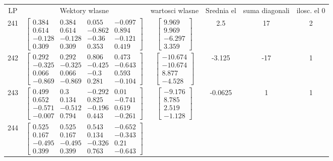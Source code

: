 \documentclass[a4paper,12pt]{article}
\begin{document}
\bgroup {} \vspace{0.2in} \begin{tabular}{c c c c c c}
LP &Wektory wlasne & wartosci wlasne & Srednia el & suma diagonali & ilosc. el 0\\
241
&
$\begin{bmatrix} 0.384 & 0.384 & 0.055 & -0.097 \\ 0.614 & 0.614 & -0.862 & 0.894 \\ -0.128 & -0.128 & -0.36 & -0.121 \\ 0.309 & 0.309 & 0.353 & 0.419 \end{bmatrix}$
&
$\begin{bmatrix} 9.969 \\ 9.969 \\ -6.297 \\ 3.359 \end{bmatrix}$
&
2.5
&
17
&
2
\\
242
&
$\begin{bmatrix} 0.292 & 0.292 & 0.806 & 0.473 \\ -0.325 & -0.325 & -0.425 & -0.643 \\ 0.066 & 0.066 & -0.3 & 0.593 \\ -0.869 & -0.869 & 0.281 & -0.104 \end{bmatrix}$
&
$\begin{bmatrix} -10.674 \\ -10.674 \\ 8.877 \\ -4.528 \end{bmatrix}$
&
-3.125
&
-17
&
1
\\
243
&
$\begin{bmatrix} 0.499 & 0.3 & -0.292 & 0.01 \\ 0.652 & 0.134 & 0.825 & -0.741 \\ -0.571 & -0.512 & -0.196 & 0.619 \\ -0.007 & 0.794 & 0.443 & -0.261 \end{bmatrix}$
&
$\begin{bmatrix} -9.176 \\ 8.785 \\ 2.519 \\ -1.128 \end{bmatrix}$
&
-0.0625
&
1
&
1
\\
244
&
$\begin{bmatrix} 0.525 & 0.525 & 0.543 & -0.652 \\ 0.167 & 0.167 & 0.134 & -0.343 \\ -0.495 & -0.495 & -0.326 & 0.21 \\ 0.399 & 0.399 & 0.763 & -0.643 \end{bmatrix}$

\end{tabular}
\end{document}
